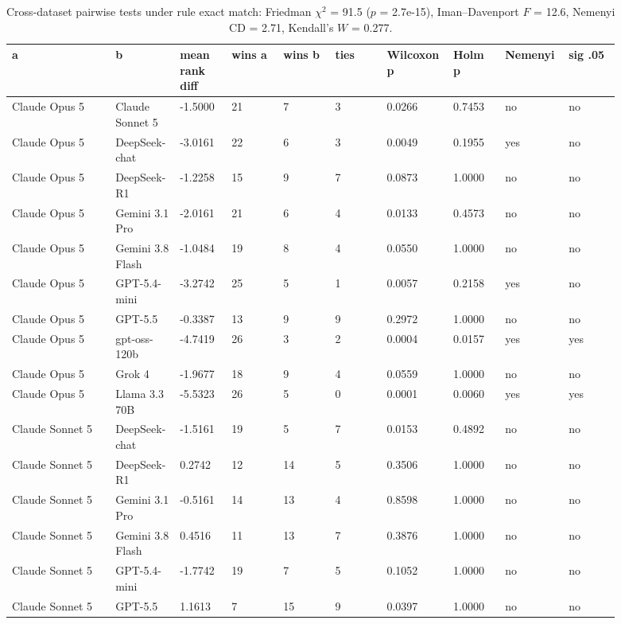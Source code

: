 \begin{landscape}
\tiny
\setlength{\tabcolsep}{3pt}
\begin{longtable}{p{0.162\linewidth}p{0.081\linewidth}p{0.081\linewidth}p{0.081\linewidth}p{0.081\linewidth}p{0.081\linewidth}p{0.081\linewidth}p{0.081\linewidth}p{0.081\linewidth}p{0.081\linewidth}}
\caption{Cross-dataset pairwise tests under rule exact match: Friedman $\chi^2$ = 91.5 ($p$ = 2.7e-15), Iman--Davenport $F$ = 12.6, Nemenyi CD = 2.71, Kendall's $W$ = 0.277.}\label{tab:pairwise_em_only}\\
\toprule
a & b & mean rank diff & wins a & wins b & ties & Wilcoxon p & Holm p & Nemenyi & sig .05 \\
\midrule
Claude Opus 5 & Claude Sonnet 5 & -1.5000 & 21 & 7 & 3 & 0.0266 & 0.7453 & no & no \\
Claude Opus 5 & DeepSeek-chat & -3.0161 & 22 & 6 & 3 & 0.0049 & 0.1955 & yes & no \\
Claude Opus 5 & DeepSeek-R1 & -1.2258 & 15 & 9 & 7 & 0.0873 & 1.0000 & no & no \\
Claude Opus 5 & Gemini 3.1 Pro & -2.0161 & 21 & 6 & 4 & 0.0133 & 0.4573 & no & no \\
Claude Opus 5 & Gemini 3.8 Flash & -1.0484 & 19 & 8 & 4 & 0.0550 & 1.0000 & no & no \\
Claude Opus 5 & GPT-5.4-mini & -3.2742 & 25 & 5 & 1 & 0.0057 & 0.2158 & yes & no \\
Claude Opus 5 & GPT-5.5 & -0.3387 & 13 & 9 & 9 & 0.2972 & 1.0000 & no & no \\
Claude Opus 5 & gpt-oss-120b & -4.7419 & 26 & 3 & 2 & 0.0004 & 0.0157 & yes & yes \\
Claude Opus 5 & Grok 4 & -1.9677 & 18 & 9 & 4 & 0.0559 & 1.0000 & no & no \\
Claude Opus 5 & Llama 3.3 70B & -5.5323 & 26 & 5 & 0 & 0.0001 & 0.0060 & yes & yes \\
Claude Sonnet 5 & DeepSeek-chat & -1.5161 & 19 & 5 & 7 & 0.0153 & 0.4892 & no & no \\
Claude Sonnet 5 & DeepSeek-R1 & 0.2742 & 12 & 14 & 5 & 0.3506 & 1.0000 & no & no \\
Claude Sonnet 5 & Gemini 3.1 Pro & -0.5161 & 14 & 13 & 4 & 0.8598 & 1.0000 & no & no \\
Claude Sonnet 5 & Gemini 3.8 Flash & 0.4516 & 11 & 13 & 7 & 0.3876 & 1.0000 & no & no \\
Claude Sonnet 5 & GPT-5.4-mini & -1.7742 & 19 & 7 & 5 & 0.1052 & 1.0000 & no & no \\
Claude Sonnet 5 & GPT-5.5 & 1.1613 & 7 & 15 & 9 & 0.0397 & 1.0000 & no & no \\

\end{longtable}
\end{landscape}
